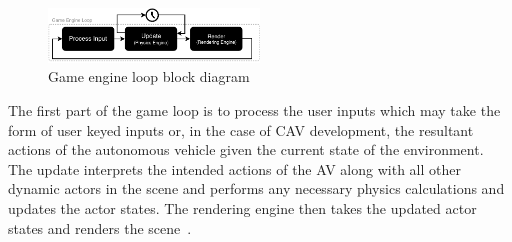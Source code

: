 \begin{figure}[h]
\centering
\includegraphics[width=0.5\textwidth]{Other/Figures/GameEngineLoop.pdf}
\caption{Game engine loop block diagram}
\label{GameEngineLoopDiagram}
\end{figure}
The first part of the game loop is to process the user inputs which may take the form of user keyed inputs or, in the case of CAV development, the resultant actions of the autonomous vehicle given the current state of the environment.  
%
The update interprets the intended actions of the AV along with all other dynamic actors in the scene and performs any necessary physics calculations and updates the actor states. 
%
The rendering engine then takes the updated actor states and renders the scene~\cite{GameProgPatternsBook}. 

